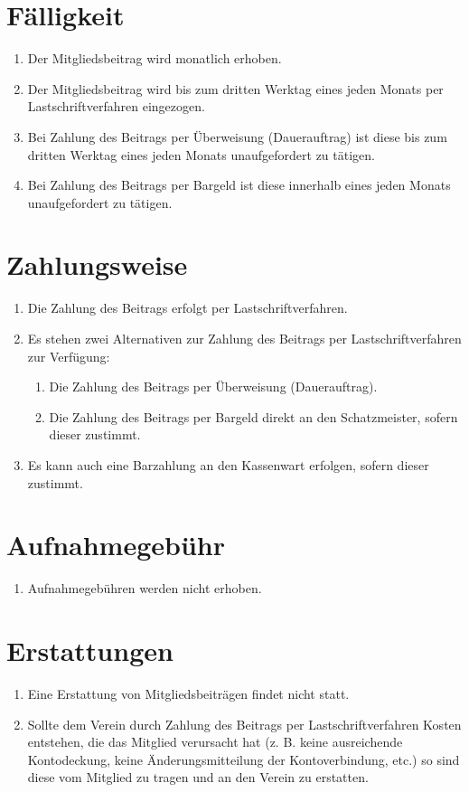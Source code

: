 \documentclass[a4paper, 12pt]{scrartcl}
\begin{document}
\section{Fälligkeit}
\begin{enumerate}
	\item Der Mitgliedsbeitrag wird monatlich erhoben.
	\item Der Mitgliedsbeitrag wird bis zum dritten Werktag eines jeden Monats per Lastschriftverfahren eingezogen.
	\item Bei Zahlung des Beitrags per Überweisung (Dauerauftrag) ist diese bis zum dritten Werktag eines jeden Monats unaufgefordert zu tätigen.
	\item Bei Zahlung des Beitrags per Bargeld ist diese innerhalb eines jeden Monats unaufgefordert zu tätigen.
\end{enumerate}

\section{Zahlungsweise}
\begin{enumerate}
	\item Die Zahlung des Beitrags erfolgt per Lastschriftverfahren.
	\item Es stehen zwei Alternativen zur Zahlung des Beitrags per Lastschriftverfahren zur Verfügung:
	\begin{enumerate}
    	\item Die Zahlung des Beitrags per Überweisung (Dauerauftrag).
        \item Die Zahlung des Beitrags per Bargeld direkt an den Schatzmeister, sofern dieser zustimmt.
    \end{enumerate}
	
	
	\item Es kann auch eine Barzahlung an den Kassenwart erfolgen, sofern dieser zustimmt.
\end{enumerate}

\section{Aufnahmegebühr}
\begin{enumerate}
	\item Aufnahmegebühren werden nicht erhoben.
\end{enumerate}

\section{Erstattungen}
\begin{enumerate}
	\item Eine Erstattung von Mitgliedsbeiträgen findet nicht statt.
	\item Sollte dem Verein durch Zahlung des Beitrags per Lastschriftverfahren Kosten entstehen, die das Mitglied verursacht hat (z. B. keine ausreichende Kontodeckung, keine Änderungsmitteilung der Kontoverbindung, etc.) so sind diese vom Mitglied zu tragen und an den Verein zu erstatten.
\end{enumerate}
\end{document}
